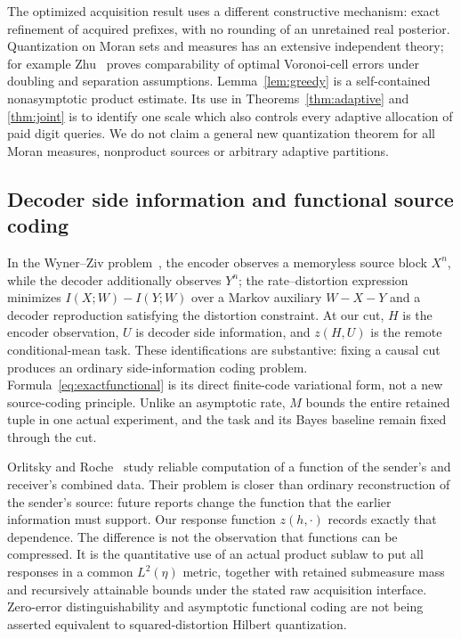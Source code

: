 The optimized acquisition result uses a different constructive mechanism: exact refinement of acquired prefixes, with no rounding of an unretained real posterior. Quantization on Moran sets and measures has an extensive independent theory; for example Zhu~\cite{zhu-moran} proves comparability of optimal Voronoi-cell errors under doubling and separation assumptions. Lemma~\ref{lem:greedy} is a self-contained nonasymptotic product estimate. Its use in Theorems~\ref{thm:adaptive} and \ref{thm:joint} is to identify one scale which also controls every adaptive allocation of paid digit queries. We do not claim a general new quantization theorem for all Moran measures, nonproduct sources or arbitrary adaptive partitions.

\subsection{Decoder side information and functional source coding}
In the Wyner--Ziv problem~\cite{wynerziv}, the encoder observes a memoryless source block $X^n$, while the decoder additionally observes $Y^n$; the rate--distortion expression minimizes $I(X;W)-I(Y;W)$ over a Markov auxiliary $W-X-Y$ and a decoder reproduction satisfying the distortion constraint. At our cut, $H$ is the encoder observation, $U$ is decoder side information, and $z(H,U)$ is the remote conditional-mean task. These identifications are substantive: fixing a causal cut produces an ordinary side-information coding problem. Formula~\eqref{eq:exactfunctional} is its direct finite-code variational form, not a new source-coding principle. Unlike an asymptotic rate, $M$ bounds the entire retained tuple in one actual experiment, and the task and its Bayes baseline remain fixed through the cut.

Orlitsky and Roche~\cite{orlitsky} study reliable computation of a function of the sender's and receiver's combined data. Their problem is closer than ordinary reconstruction of the sender's source: future reports change the function that the earlier information must support. Our response function $z(h,\cdot)$ records exactly that dependence. The difference is not the observation that functions can be compressed. It is the quantitative use of an actual product sublaw to put all responses in a common $L^2(\eta)$ metric, together with retained submeasure mass and recursively attainable bounds under the stated raw acquisition interface. Zero-error distinguishability and asymptotic functional coding are not being asserted equivalent to squared-distortion Hilbert quantization.

